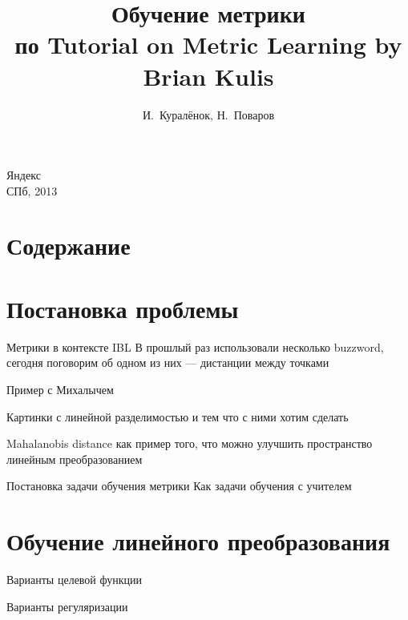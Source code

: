 \documentclass[14pt, fleqn, xcolor={dvipsnames, table}]{beamer}
\title{Обучение метрики\\\small{по Tutorial on Metric Learning by Brian Kulis}}
\author[]{\small{%
И.~Куралёнок,
Н.~Поваров}}
\date{}
\begin{document}
\begin{frame}
\maketitle
\small
\begin{center}
\vspace{-60pt}
\normalsize {\color{red}Я}ндекс \\
\vspace{80pt}
\footnotesize СПб, 2013
\end{center}
\end{frame}

\section{Содержание}
\section{Постановка проблемы}
\begin{frame}{Метрики в контексте IBL}
В прошлый раз использовали несколько buzzword, сегодня поговорим об одном из них --- дистанции между точками
\end{frame}

\begin{frame}{Пример с Михалычем}
\end{frame}

\begin{frame}{Картинки с линейной разделимостью и тем что с ними хотим сделать}
\end{frame}

\begin{frame}{Mahalanobis distance}
как пример того, что можно улучшить пространство линейным преобразованием
\end{frame}

\begin{frame}{Постановка задачи обучения метрики}
Как задачи обучения с учителем
\end{frame}


\section{Обучение линейного преобразования}

\begin{frame}{Варианты целевой функции}

\end{frame}

\begin{frame}{Варианты регуляризации}

\end{frame}
\end{document}
